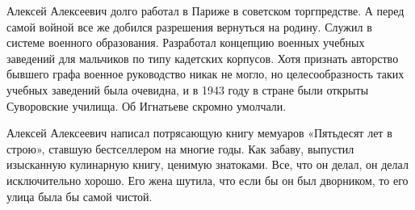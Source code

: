 Алексей Алексеевич долго работал в Париже в советском торгпредстве. А перед
самой войной все же добился разрешения вернуться на родину. Служил в системе
военного образования. Разработал концепцию военных учебных заведений для
мальчиков по типу кадетских корпусов. Хотя признать авторство бывшего графа
военное руководство никак не могло, но целесообразность таких учебных заведений
была очевидна, и в 1943 году в стране были открыты Суворовские училища. Об
Игнатьеве скромно умолчали. 

Алексей Алексеевич написал потрясающую книгу мемуаров «Пятьдесят лет в строю»,
ставшую бестселлером на многие годы. Как забаву, выпустил изысканную кулинарную
книгу, ценимую знатоками. Все, что он делал, он делал исключительно хорошо. Его
жена шутила, что если бы он был дворником, то его улица была бы самой чистой.
